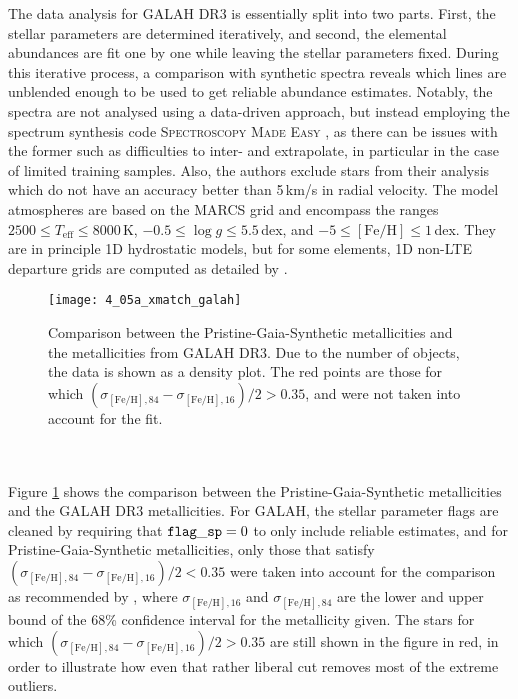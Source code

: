\documentclass[a4paper,11pt]{article}
\begin{document}
The data analysis for GALAH DR3 is essentially split into two parts. First, the stellar parameters are determined iteratively, and second, the elemental abundances are fit one by one while leaving the stellar parameters fixed. During this iterative process, a comparison with synthetic spectra reveals which lines are unblended enough to be used to get reliable abundance estimates. Notably, the spectra are not analysed using a data-driven approach, but instead employing the spectrum synthesis code \textsc{Spectroscopy Made Easy} \citep[\textsc{SME},][]{sme}, as there can be issues with the former such as difficulties to inter- and extrapolate, in particular in the case of limited training samples. Also, the authors exclude stars from their analysis which do not have an accuracy better than 5\,km/s in radial velocity. The model atmospheres are based on the \textsc{MARCS} grid \citep{marcs} and encompass the ranges $2500\leq T_\mathrm{eff}\leq8000$\,K, $-0.5\leq\log{g}\leq5.5$\,dex, and $-5\leq\mathrm{[Fe/H]}\leq1$\,dex. They are in principle 1D hydrostatic models, but for some elements, 1D non-LTE departure grids are computed as detailed by \citet{amarsi20}.
%
\begin{figure}
 \centering
 \texttt{[image: 4\_05a\_xmatch\_galah]}
 \caption[Metallicity comparison to GALAH]{Comparison between the Pristine-Gaia-Synthetic metallicities and the metallicities from GALAH DR3. Due to the number of objects, the data is shown as a density plot. The red points are those for which $(\sigma_{\mathrm{[Fe/H]},84}-\sigma_{\mathrm{[Fe/H]},16})/2>0.35$, and were not taken into account for the fit.}
 \label{fig:xmatch_galah}
\end{figure}\\ \\
%
Figure \ref{fig:xmatch_galah} shows the comparison between the Pristine-Gaia-Synthetic metallicities and the GALAH DR3 metallicities. For GALAH, the stellar parameter flags are cleaned by requiring that $\mathrm{{\tt flag\_sp}}=0$ to only include reliable estimates, and for Pristine-Gaia-Synthetic metallicities, only those that satisfy $(\sigma_{\mathrm{[Fe/H]},84}-\sigma_{\mathrm{[Fe/H]},16})/2<0.35$ were taken into account for the comparison as recommended by \citet{pristinegaia}, where $\sigma_{\mathrm{[Fe/H]},16}$ and $\sigma_{\mathrm{[Fe/H]},84}$ are the lower and upper bound of the 68\% confidence interval for the metallicity given. The stars for which $(\sigma_{\mathrm{[Fe/H]},84}-\sigma_{\mathrm{[Fe/H]},16})/2>0.35$ are still shown in the figure in red, in order to illustrate how even that rather liberal cut removes most of the extreme outliers.\\ \\
\end{document}

